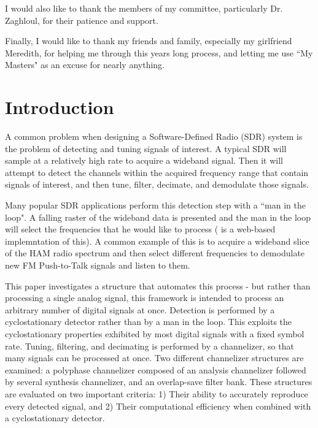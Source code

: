 \documentclass[12pt]{report}
\begin{document}
I would also like to thank the members of my committee, particularly Dr.
Zaghloul, for their patience and support.

Finally, I would like to thank my friends and family, especially my girlfriend
Meredith, for helping me through this years long process, and letting me use
``My Masters" as an excuse for nearly anything.

\tableofcontents
\pagebreak

\listoffigures
\pagebreak


\pagestyle{myheadings}

\chapter{Introduction}
\label{sec:intro}

A common problem when designing a Software-Defined Radio (SDR) system is the
problem of detecting and tuning signals of interest. A typical SDR will sample
at a relatively high rate to acquire a wideband signal. Then it will attempt to
detect the channels within the acquired frequency range that contain signals of
interest, and then tune, filter, decimate, and demodulate those signals. 

Many popular SDR applications perform this detection step with a ``man in the
loop".  A falling raster of the wideband data is presented and the man in the
loop will select  the frequencies that he would like to process (\cite{WebSDR}
is a web-based implemntation of this).  A common example of this is to acquire
a wideband slice of the HAM radio spectrum and then select different
frequencies to demodulate new FM Push-to-Talk signals and listen to them.

This paper investigates a structure that automates this process - but rather
than processing a single analog signal, this framework is intended to process
an arbitrary number of digital signals at once. Detection is performed by
a cyclostationary detector rather than by a man in the loop. This exploits the
cyclostationary properties exhibited by most digital signals with a fixed
symbol rate.  Tuning, filtering, and decimating is performed by a channelizer,
so that many signals can be processed at once.  Two different channelizer
structures are examined: a polyphase channelizer composed of an analysis
channelizer followed by several synthesis channelizer, and an overlap-save
filter bank. These structures are evaluated on two important criteria:
1) Their ability to accurately reproduce every detected signal, and 2) Their
computational efficiency when combined with a cyclostationary detector.
\end{document}
